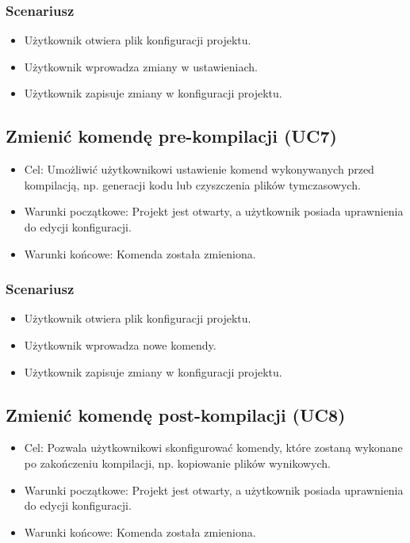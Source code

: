 \subsubsection{Scenariusz}
\begin{itemize}
    \item Użytkownik otwiera plik konfiguracji projektu.
    \item Użytkownik wprowadza zmiany w ustawieniach.
    \item Użytkownik zapisuje zmiany w konfiguracji projektu.
\end{itemize}

\subsection{Zmienić komendę pre-kompilacji (UC7)}
\begin{itemize}
    \item Cel: Umożliwić użytkownikowi ustawienie komend wykonywanych przed kompilacją, np. generacji kodu lub czyszczenia plików tymczasowych.
    \item Warunki początkowe: Projekt jest otwarty, a użytkownik posiada uprawnienia do edycji konfiguracji.
    \item Warunki końcowe: Komenda została zmieniona.
\end{itemize}

\subsubsection{Scenariusz}
\begin{itemize}
    \item Użytkownik otwiera plik konfiguracji projektu.
    \item Użytkownik wprowadza nowe komendy.
    \item Użytkownik zapisuje zmiany w konfiguracji projektu.
\end{itemize}

\subsection{Zmienić komendę post-kompilacji (UC8)}
\begin{itemize}
    \item Cel: Pozwala użytkownikowi skonfigurować komendy, które zostaną wykonane po zakończeniu kompilacji, np. kopiowanie plików wynikowych.
    \item Warunki początkowe: Projekt jest otwarty, a użytkownik posiada uprawnienia do edycji konfiguracji.
    \item Warunki końcowe: Komenda została zmieniona.
\end{itemize}

